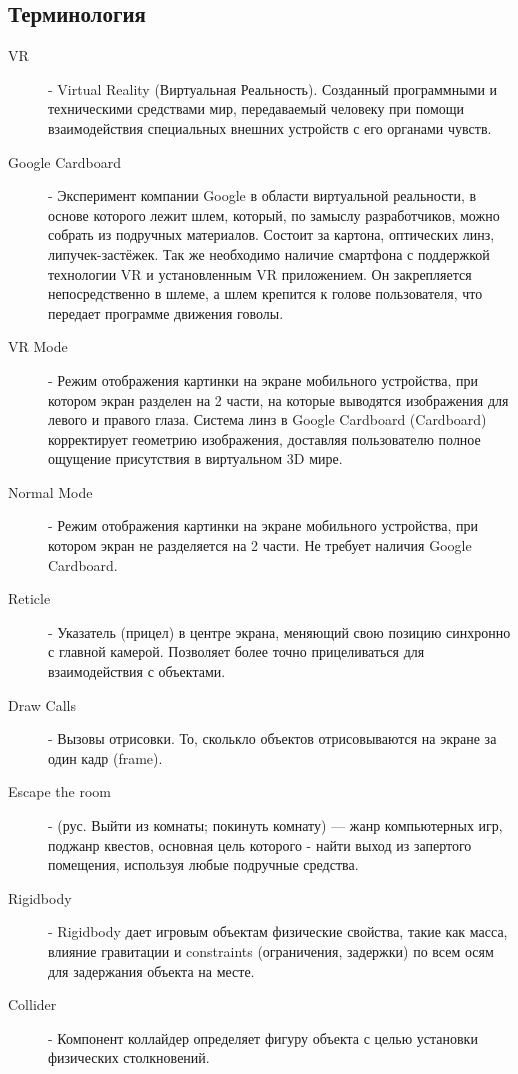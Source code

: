 \subsection{Терминология}
\begin{description}
    
    
    \item[VR] - 
    Virtual Reality (Виртуальная Реальность). Созданный программными и техническими 
    средствами мир, передаваемый человеку при помощи взаимодействия специальных 
    внешних устройств с его органами чувств. 
    
    \item[Google Cardboard] - 
    Эксперимент компании Google в области виртуальной реальности, в основе которого 
    лежит шлем, который, по замыслу разработчиков, можно собрать из подручных 
    материалов. Состоит за картона, оптических линз, липучек-застёжек. Так же 
    необходимо наличие смартфона с поддержкой технологии VR и установленным VR 
    приложением. Он закрепляется непосредственно в шлеме, а шлем крепится к голове 
    пользователя, что передает программе движения говолы. 
    
    \item[VR Mode] - 
    Режим отображения картинки на экране мобильного устройства, при котором экран 
    разделен на 2 части, на которые выводятся изображения для левого и правого 
    глаза. Система линз в Google Cardboard (Cardboard) корректирует геометрию 
    изображения, доставляя пользователю полное ощущение присутствия в виртуальном 
    3D мире.
    
    \item[Normal Mode] - 
    Режим отображения картинки на экране мобильного устройства, при котором экран 
    не разделяется на 2 части. Не требует наличия Google Cardboard. 
    
    \item[Reticle] - 
    Указатель (прицел) в центре экрана, меняющий свою позицию синхронно с главной 
    камерой. Позволяет более точно прицеливаться для взаимодействия с объектами.
    
    \item[Draw Calls] - 
    Вызовы отрисовки. То, сколькло объектов отрисовываются на экране за один кадр 
    (frame). 
    
    \item[Escape the room] - 
    (рус. Выйти из комнаты; покинуть комнату) — жанр компьютерных игр, поджанр 
    квестов, основная цель которого - найти выход из запертого помещения, используя 
    любые подручные средства. 
    
    \item[Rigidbody] - 
    Rigidbody дает игровым объектам физические свойства, такие как масса, влияние гравитации и constraints (ограничения, задержки) по всем осям для задержания объекта на месте.
    
    \item[Collider] - 
    Компонент коллайдер определяет фигуру объекта с целью установки физических столкновений.
\end{description}

